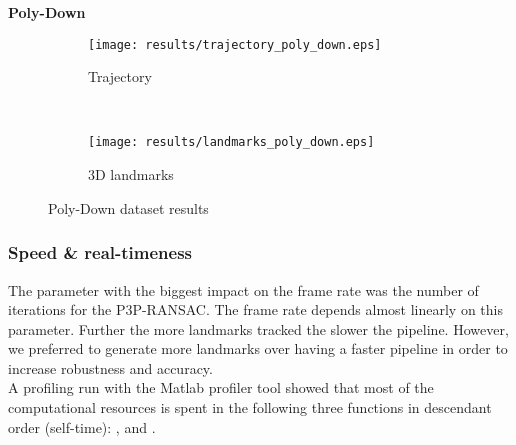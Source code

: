 \textbf{Poly-Down}
\begin{figure*}[ht!]
    \centering
    \begin{subfigure}[t]{0.5\textwidth}
        \centering
        \texttt{[image: results/trajectory\_poly\_down.eps]}
        \caption{Trajectory}
    \end{subfigure}%
    ~ 
    \begin{subfigure}[t]{0.5\textwidth}
        \centering
        \texttt{[image: results/landmarks\_poly\_down.eps]}
        \caption{3D landmarks}
    \end{subfigure}
    \caption{Poly-Down dataset results}
		\label{poly_down_result_fig}
\end{figure*}

\subsubsection{Speed \& real-timeness}
The parameter with the biggest impact on the frame rate was the number of iterations for the P3P-RANSAC. The frame rate depends almost linearly on this parameter. Further the more landmarks tracked the slower the pipeline. However, we preferred to generate more landmarks over having a faster pipeline in order to increase robustness and accuracy.\\

A profiling run with the Matlab profiler tool showed that most of the computational resources is spent in the following three functions in descendant order (self-time): ,  and .

